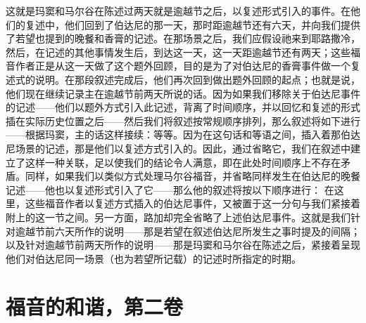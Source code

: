 这就是玛窦和马尔谷在陈述过两天就是逾越节之后，以复述形式引入的事件。在他们的复述中，他们回到了伯达尼的那一天，那时距逾越节还有六天，并向我们提供了若望也提到的晚餐和香膏的记述。在那场景之后，我们应假设祂来到耶路撒冷，然后，在记述的其他事情发生后，到达这一天，这一天距逾越节还有两天；这些福音作者正是从这一天做了这个题外回顾，目的是为了对伯达尼的香膏事件做一个复述式的说明。在那段叙述完成后，他们再次回到做出题外回顾的起点；也就是说，他们现在继续记录主在逾越节前两天所说的话。因为如果我们移除关于伯达尼事件的记述——他们以题外方式引入此记述，背离了时间顺序，并以回忆和复述的形式插在实际历史位置之后——然后我们将叙述按常规顺序排列，那么叙述将如下进行——根据玛窦，主的话这样接续：等等。因为在这句话和等语之间，插入着那伯达尼场景的记述，那是他们以复述方式引入的。因此，通过省略它，我们在叙述中建立了这样一种关联，足以使我们的结论令人满意，即在此处时间顺序上不存在矛盾。同样，如果我们以类似方式处理马尔谷福音，并省略同样发生在伯达尼的晚餐记述——他也以复述形式引入了它——那么他的叙述将按以下顺序进行： 在这里，这些福音作者以复述方式插入的伯达尼事件，又被置于这一分句与我们紧接着附上的这一节之间。另一方面，路加却完全省略了上述伯达尼事件。这就是我们针对逾越节前六天所作的说明——那是若望在叙述伯达尼所发生之事时提及的间隔；以及针对逾越节前两天所作的说明——那是玛窦和马尔谷在陈述之后，紧接着呈现他们对伯达尼同一场景（也为若望所记载）的记述时所指定的时期。\par



\section{福音的和谐，第二卷}

